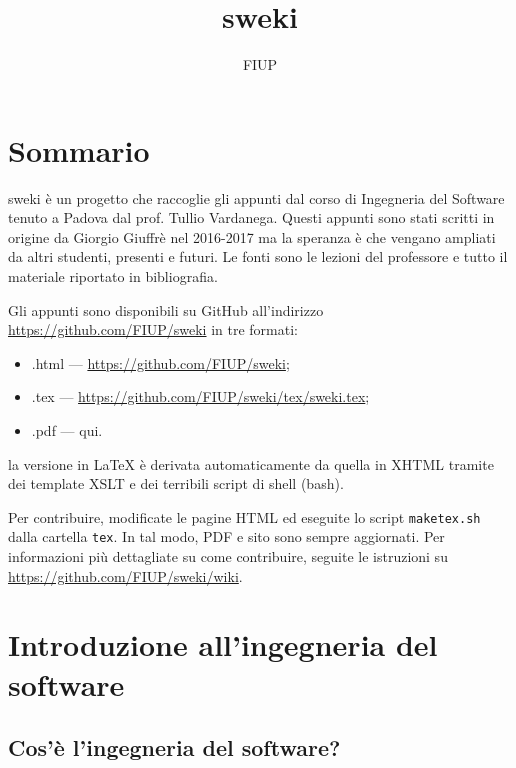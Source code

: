 \documentclass[a4paper]{article}
\title{sweki}
\author{FIUP}
\date{}
\begin{document}
\maketitle
\tableofcontents
\newpage


\section{Sommario}
sweki è un progetto che raccoglie gli appunti dal corso di Ingegneria del Software tenuto a Padova dal prof. Tullio Vardanega. Questi appunti sono stati scritti in origine da Giorgio Giuffrè nel 2016-2017 ma la speranza è che vengano ampliati da altri studenti, presenti e futuri. Le fonti sono le lezioni del professore e tutto il materiale riportato in bibliografia.

Gli appunti sono disponibili su GitHub all'indirizzo \url{https://github.com/FIUP/sweki} in tre formati:
\begin{itemize}
	\item .html --- \url{https://github.com/FIUP/sweki};
	\item .tex --- \url{https://github.com/FIUP/sweki/tex/sweki.tex};
	\item .pdf --- qui.
\end{itemize}

la versione in \LaTeX{} è derivata automaticamente da quella in XHTML tramite dei template XSLT e dei terribili script di shell (bash).

Per contribuire, modificate le pagine HTML ed eseguite lo script \texttt{maketex.sh} dalla cartella \texttt{tex}. In tal modo, PDF e sito sono sempre aggiornati. Per informazioni più dettagliate su come contribuire, seguite le istruzioni su \url{https://github.com/FIUP/sweki/wiki}.



		
	\section{Introduzione all'ingegneria del software}


		
	\subsection{Cos'è l'ingegneria del software?}
\end{document}
